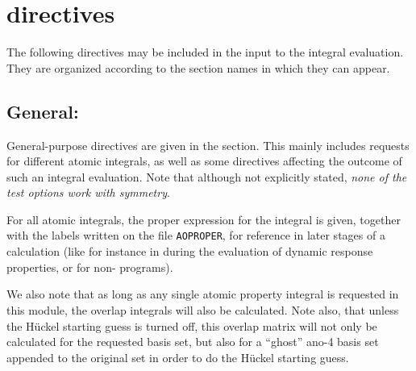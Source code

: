 \section{ directives}\label{sec:herinp}

          The following directives may be included in the input to
the integral evaluation.  They are organized according to the
section names in which they can appear.

%


\subsection{General: }

General-purpose directives are given in the 
section. This mainly includes requests for different atomic integrals,
as well as some
directives affecting the outcome of such an integral evaluation. Note
that although not explicitly stated, {\em none of the test options
work with symmetry}.

For all atomic integrals, the proper expression for the integral is
given, together with the labels written on the file
\texttt{AOPROPER}, for
reference in later stages of a {\dalton} calculation (like for instance
in during the evaluation of dynamic response properties, or for
non-{\dalton} programs).

We also note that as long as any single atomic property
integral is
requested in this module, the overlap integrals will also be
calculated. Note also, that unless the H\"{u}ckel starting guess is turned
off, this overlap matrix will not only be calculated for the requested
basis set, but also for a ``ghost'' ano-4 basis set appended to the
original set in order to do the H\"{u}ckel starting guess.

